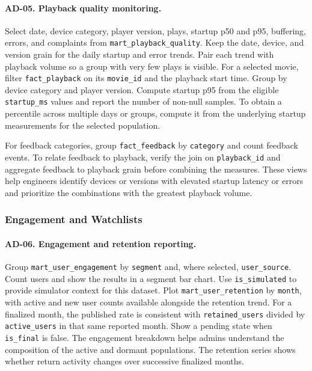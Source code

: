 \documentclass[a4paper,12pt]{article}
\newcommand{\dbsep}{\_\allowbreak}
\begin{document}
\paragraph{AD-05. Playback quality monitoring.}
Select date, device category, player version, plays, startup p50
and p95, buffering, errors, and complaints from
\texttt{mart\dbsep playback\dbsep quality}. Keep the date, device,
and version grain for the daily startup and error trends. Pair each
trend with playback volume so a group with very few plays is visible.
For a selected movie, filter \texttt{fact\dbsep playback} on its
\texttt{movie\_id} and the playback start time. Group by device
category and player version. Compute startup p95 from the eligible
\texttt{startup\_ms} values and report the number of non-null samples.
To obtain a percentile across multiple days or groups, compute it
from the underlying startup measurements for the selected population.

For feedback categories, group \texttt{fact\dbsep feedback} by
\texttt{category} and count feedback events. To relate feedback to
playback, verify the join on \texttt{playback\_id} and aggregate
feedback to playback grain before combining the measures. These views
help engineers identify devices or versions with elevated startup
latency or errors and prioritize the combinations with the greatest
playback volume.

\subsubsection{Engagement and Watchlists}

\paragraph{AD-06. Engagement and retention reporting.}
Group \texttt{mart\dbsep user\dbsep engagement} by \texttt{segment}
and, where selected, \texttt{user\_source}. Count users and show
the results in a segment bar chart. Use \texttt{is\_simulated} to
provide simulator context for this dataset. Plot
\texttt{mart\dbsep user\dbsep retention} by \texttt{month}, with
active and new user counts available alongside the retention trend.
For a finalized month, the published rate is consistent with
\texttt{retained\_users} divided by \texttt{active\_users} in that
same reported month. Show a pending state when \texttt{is\_final}
is false. The engagement breakdown helps admins understand the
composition of the active and dormant populations. The retention
series shows whether return activity changes over successive
finalized months.
\end{document}
